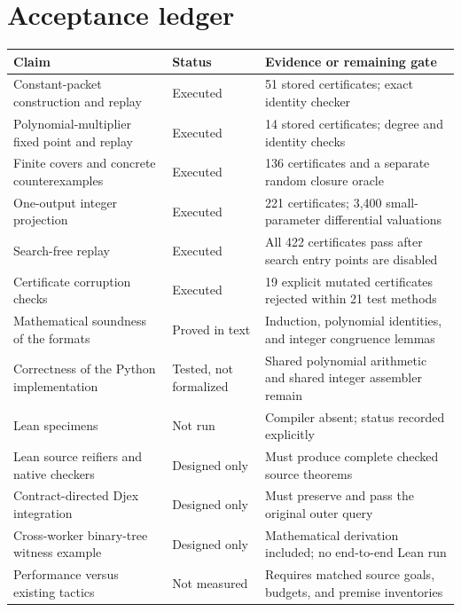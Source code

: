 \section{Acceptance ledger}
\label{app:status}
\begingroup\small
\begin{longtable}{@{}p{}p{}p{}@{}}
\toprule
Claim & Status & Evidence or remaining gate \\
\midrule
\endhead
Constant-packet construction and replay & Executed & 51 stored certificates; exact identity checker \\
Polynomial-multiplier fixed point and replay & Executed & 14 stored certificates; degree and identity checks \\
Finite covers and concrete counterexamples & Executed & 136 certificates and a separate random closure oracle \\
One-output integer projection & Executed & 221 certificates; 3,400 small-parameter differential valuations \\
Search-free replay & Executed & All 422 certificates pass after search entry points are disabled \\
Certificate corruption checks & Executed & 19 explicit mutated certificates rejected within 21 test methods \\
Mathematical soundness of the formats & Proved in text & Induction, polynomial identities, and integer congruence lemmas \\
Correctness of the Python implementation & Tested, not formalized & Shared polynomial arithmetic and shared integer assembler remain \\
Lean specimens & Not run & Compiler absent; status recorded explicitly \\
Lean source reifiers and native checkers & Designed only & Must produce complete checked source theorems \\
Contract-directed Djex integration & Designed only & Must preserve and pass the original outer query \\
Cross-worker binary-tree witness example & Designed only & Mathematical derivation included; no end-to-end Lean run \\
Performance versus existing tactics & Not measured & Requires matched source goals, budgets, and premise inventories \\
\bottomrule
\end{longtable}
\endgroup
